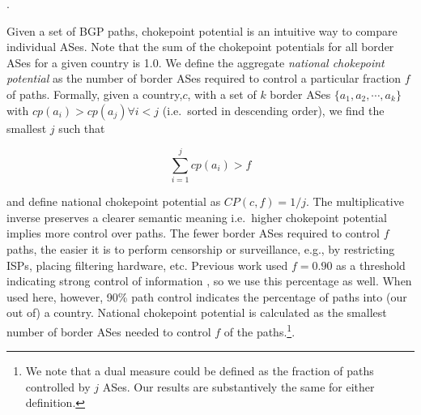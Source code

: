 .

Given a set of BGP paths, chokepoint potential is an intuitive way to
compare individual ASes. Note that the sum of the chokepoint potentials
for all border ASes for a given country is 1.0.
We define the aggregate \emph{national chokepoint potential} as the number of
border ASes required to control a particular fraction $f$ of paths. Formally,
given a country,$c$, with a set of $k$ border ASes $\{a_1,a_2,\cdots,a_k\}$ with
$cp(a_i)>cp(a_j) \forall i<j$ (i.e.\ sorted in descending order), we find the smallest $j$ such that 

\begin{equation}
  \label{eq:nationalchokepoint}
  \sum_{i=1}^j cp(a_i) > f
\end{equation}

and define national chokepoint potential as $CP(c,f) = 1/j$. The
multiplicative inverse preserves a clearer semantic meaning i.e.\ higher
chokepoint potential implies more control over paths. The fewer border ASes
required to control $f$ paths, the easier it is to perform
censorship or surveillance, e.g., by restricting ISPs,
placing filtering hardware, etc. 
Previous work used $f=0.90$ as a threshold indicating strong control of information
\cite{throats}, so we use this percentage as well. When used here, however,
90\% path control indicates the percentage of paths into (our out of) a country.
National chokepoint potential is calculated
as the smallest number of
border ASes needed to control $f$ of the paths.\footnote{We note that a dual measure
could be defined as the fraction of paths controlled by $j$ ASes. Our results
are substantively the same for either definition.}. 

